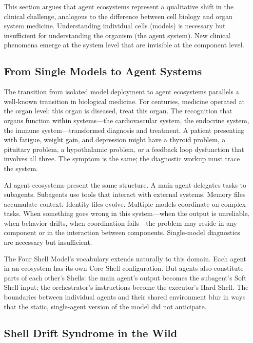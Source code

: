 \documentclass[11pt]{article}
\begin{document}
This section argues that agent ecosystems represent a qualitative shift in the clinical challenge, analogous to the difference between cell biology and organ system medicine. Understanding individual cells (models) is necessary but insufficient for understanding the organism (the agent system). New clinical phenomena emerge at the system level that are invisible at the component level.

\subsection{From Single Models to Agent Systems}

The transition from isolated model deployment to agent ecosystems parallels a well-known transition in biological medicine. For centuries, medicine operated at the organ level: this organ is diseased, treat this organ. The recognition that organs function within systems---the cardiovascular system, the endocrine system, the immune system---transformed diagnosis and treatment. A patient presenting with fatigue, weight gain, and depression might have a thyroid problem, a pituitary problem, a hypothalamic problem, or a feedback loop dysfunction that involves all three. The symptom is the same; the diagnostic workup must trace the system.

AI agent ecosystems present the same structure. A main agent delegates tasks to subagents. Subagents use tools that interact with external systems. Memory files accumulate context. Identity files evolve. Multiple models coordinate on complex tasks. When something goes wrong in this system---when the output is unreliable, when behavior drifts, when coordination fails---the problem may reside in any component or in the interaction between components. Single-model diagnostics are necessary but insufficient.

The Four Shell Model's vocabulary extends naturally to this domain. Each agent in an ecosystem has its own Core-Shell configuration. But agents also constitute parts of each other's Shells: the main agent's output becomes the subagent's Soft Shell input; the orchestrator's instructions become the executor's Hard Shell. The boundaries between individual agents and their shared environment blur in ways that the static, single-agent version of the model did not anticipate.

\subsection{Shell Drift Syndrome in the Wild}
\end{document}
